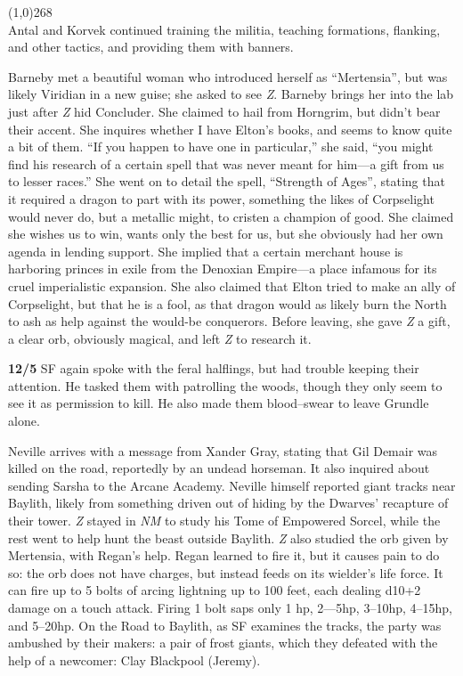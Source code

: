 \documentclass[letterpaper]{article}
\newcommand{\colline}{\noindent\line(1,0){268} \\}
\newcommand{\e}[1]{\emph{#1}}
\newcommand{\B}[1]{\textbf{#1}}
\newenvironment{notesection}[1]
{\noindent {\huge \B{#1}} \par
\vspace{-0.75em}
\colline
\begingroup\fontsize{9pt}{12pt}\selectfont}
{\endgroup}
\begin{document}
\begin{notesection}{Events}
Antal and Korvek continued training the militia, teaching formations, flanking, and other tactics, and providing them with banners.

Barneby met a beautiful woman who introduced herself as ``Mertensia'', but was likely Viridian in a new guise; she asked to see \e{Z}. Barneby brings her into the lab just after \e{Z} hid Concluder.  She claimed to hail from Horngrim, but didn't bear their accent.  She inquires whether I have Elton's books, and seems to know quite a bit of them.  ``If you happen to have one in particular,'' she said, ``you might find his research of a certain spell that was never meant for him---a gift from us to lesser races.'' She went on to detail the spell, ``Strength of Ages'', stating that it required a dragon to part with its power, something the likes of Corpselight would never do, but a metallic might, to cristen a champion of good.  She claimed she wishes us to win, wants only the best for us, but she obviously had her own agenda in lending support.  She implied that a certain merchant house is harboring princes in exile from the Denoxian Empire---a place infamous for its cruel imperialistic expansion.  She also claimed that Elton tried to make an ally of Corpselight, but that he is a fool, as that dragon would as likely burn the North to ash as help against the would-be conquerors. Before leaving, she gave \e{Z} a gift, a clear orb, obviously magical, and left \e{Z} to research it.

{\color{Red}\B{12/5}} SF again spoke with the feral halflings, but had trouble keeping their attention.  He tasked them with patrolling the woods, though they only seem to see it as permission to kill. He also made them blood--swear to leave Grundle alone.

Neville arrives with a message from Xander Gray, stating that Gil Demair was killed on the road, reportedly by an undead horseman. It also inquired about sending Sarsha to the Arcane Academy.  Neville himself reported giant tracks near Baylith, likely from something driven out of hiding by the Dwarves' recapture of their tower.  \e{Z} stayed in \e{NM} to study his Tome of Empowered Sorcel, while the rest went to help hunt the beast outside Baylith. \e{Z} also studied the orb given by Mertensia, with Regan's help.  Regan learned to fire it, but it causes pain to do so: the orb does not have charges, but instead feeds on its wielder's life force.  It can fire up to 5 bolts of arcing lightning up to 100 feet, each dealing d10+2 damage on a touch attack.  Firing 1 bolt saps only 1 hp, 2---5hp, 3--10hp, 4--15hp, and 5--20hp.  On the Road to Baylith, as SF examines the tracks, the party was ambushed by their makers: a pair of frost giants, which they defeated with the help of a newcomer: Clay Blackpool (Jeremy).


\end{notesection}
\end{document}
